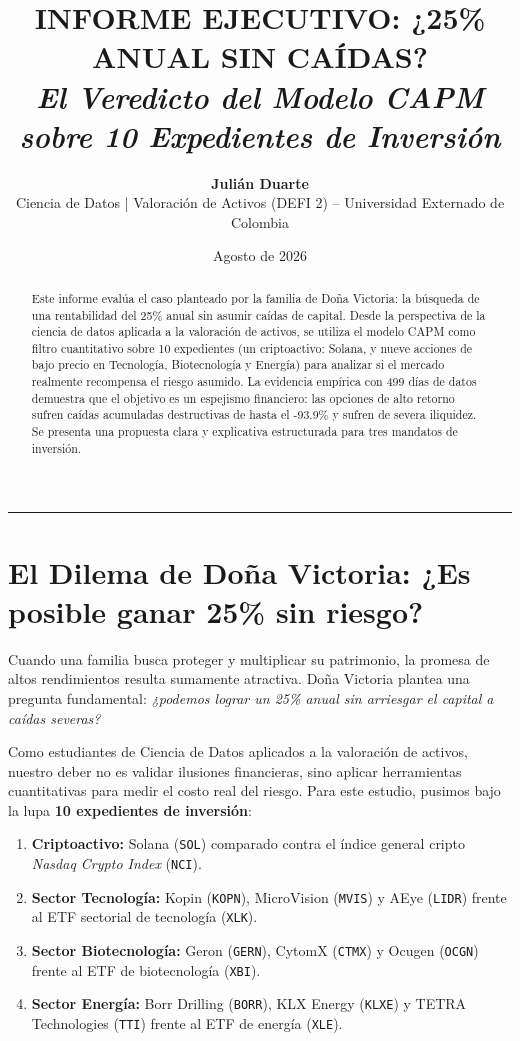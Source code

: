 \documentclass[11pt,a4paper]{article}
\title{\vspace{-1.2cm}\Large\bfseries\color{navyblue} INFORME EJECUTIVO: ¿25\% ANUAL SIN CAÍDAS?\\
\large\textit{El Veredicto del Modelo CAPM sobre 10 Expedientes de Inversión}}
\author{\textbf{Julián Duarte} \\
Ciencia de Datos | Valoración de Activos (DEFI 2) -- Universidad Externado de Colombia}
\date{Agosto de 2026}
\begin{document}
\maketitle

\begin{abstract}
\noindent Este informe evalúa el caso planteado por la familia de Doña Victoria: la búsqueda de una rentabilidad del 25\% anual sin asumir caídas de capital. Desde la perspectiva de la ciencia de datos aplicada a la valoración de activos, se utiliza el modelo CAPM como filtro cuantitativo sobre 10 expedientes (un criptoactivo: Solana, y nueve acciones de bajo precio en Tecnología, Biotecnología y Energía) para analizar si el mercado realmente recompensa el riesgo asumido. La evidencia empírica con 499 días de datos demuestra que el objetivo es un espejismo financiero: las opciones de alto retorno sufren caídas acumuladas destructivas de hasta el -93.9\% y sufren de severa iliquidez. Se presenta una propuesta clara y explicativa estructurada para tres mandatos de inversión.
\end{abstract}

\hrule
\vspace{0.2cm}

\section{El Dilema de Doña Victoria: ¿Es posible ganar 25\% sin riesgo?}

Cuando una familia busca proteger y multiplicar su patrimonio, la promesa de altos rendimientos resulta sumamente atractiva. Doña Victoria plantea una pregunta fundamental: \textit{¿podemos lograr un 25\% anual sin arriesgar el capital a caídas severas?}

Como estudiantes de Ciencia de Datos aplicados a la valoración de activos, nuestro deber no es validar ilusiones financieras, sino aplicar herramientas cuantitativas para medir el costo real del riesgo. Para este estudio, pusimos bajo la lupa \textbf{10 expedientes de inversión}:
\begin{enumerate}[leftmargin=*]
    \item \textbf{Criptoactivo:} Solana (\texttt{SOL}) comparado contra el índice general cripto \textit{Nasdaq Crypto Index} (\texttt{NCI}).
    \item \textbf{Sector Tecnología:} Kopin (\texttt{KOPN}), MicroVision (\texttt{MVIS}) y AEye (\texttt{LIDR}) frente al ETF sectorial de tecnología (\texttt{XLK}).
    \item \textbf{Sector Biotecnología:} Geron (\texttt{GERN}), CytomX (\texttt{CTMX}) y Ocugen (\texttt{OCGN}) frente al ETF de biotecnología (\texttt{XBI}).
    \item \textbf{Sector Energía:} Borr Drilling (\texttt{BORR}), KLX Energy (\texttt{KLXE}) y TETRA Technologies (\texttt{TTI}) frente al ETF de energía (\texttt{XLE}).
\end{enumerate}
\end{document}
